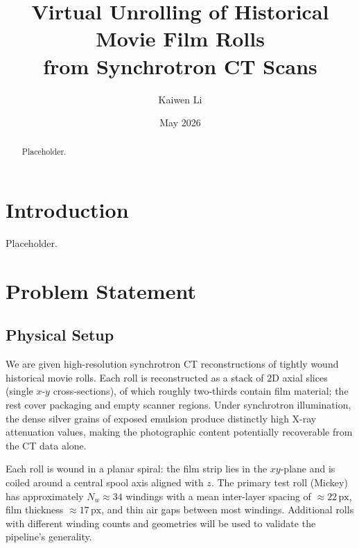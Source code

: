 \documentclass[11pt,a4paper]{article}
\title{Virtual Unrolling of Historical Movie Film Rolls\\from Synchrotron CT Scans}
\author{Kaiwen Li}
\date{May 2026}
\begin{document}
\maketitle

\begin{abstract}
Placeholder.
\end{abstract}

\newpage
\tableofcontents
\newpage


\section{Introduction}

Placeholder.


\section{Problem Statement}

\subsection{Physical Setup}

We are given high-resolution synchrotron CT reconstructions of tightly wound historical movie rolls. Each roll is reconstructed as a stack of 2D axial slices (single $x$-$y$ cross-sections), of which roughly two-thirds contain film material; the rest cover packaging and empty scanner regions. Under synchrotron illumination, the dense silver grains of exposed emulsion produce distinctly high X-ray attenuation values, making the photographic content potentially recoverable from the CT data alone.

Each roll is wound in a planar spiral: the film strip lies in the $xy$-plane and is coiled around a central spool axis aligned with $z$. The primary test roll (Mickey) has approximately $N_w \approx 34$ windings with a mean inter-layer spacing of $\approx 22\,\text{px}$, film thickness $\approx 17\,\text{px}$, and thin air gaps between most windings. Additional rolls with different winding counts and geometries will be used to validate the pipeline's generality.
\end{document}
